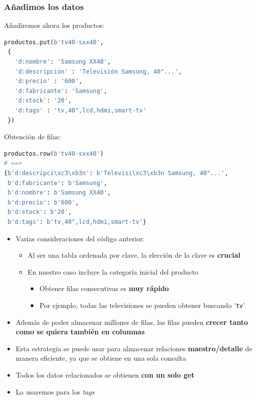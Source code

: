 \documentclass[14pt]{beamer}
\begin{document}
\begin{frame}
  \frametitle{Añadimos los datos}
Añadiremos ahora los productos:

\begin{lstlisting}[language=python]
productos.put(b'tv40-sxx40',
 {
   'd:nombre': 'Samsung XX40',
   'd:descripción' : 'Televisión Samsung, 40"...',
   'd:precio' : '600',
   'd:fabricante': 'Samsung',
   'd:stock': '20',
   'd:tags' : 'tv,40",lcd,hdmi,smart-tv'
 })
\end{lstlisting}



\framebreak
Obtención de filas:

\begin{lstlisting}[language=python]
productos.row(b'tv40-sxx40')
# ==>
{b'd:descripci\xc3\xb3n': b'Televisi\xc3\xb3n Samsung, 40"...',
 b'd:fabricante': b'Samsung',
 b'd:nombre': b'Samsung XX40',
 b'd:precio': b'600',
 b'd:stock': b'20',
 b'd:tags': b'tv,40",lcd,hdmi,smart-tv'}
\end{lstlisting}

\framebreak

\begin{itemize}
\item Varias consideraciones del código anterior:
  \begin{itemize}
  \item Al ser una tabla ordenada por clave, la elección de la clave es
    {\bf crucial}
  \item En nuestro caso incluye la categoría inicial del producto
    \begin{itemize}
    \item Obtener filas consecutivas es {\bf muy rápido}
    \item Por ejemplo, todas las televisiones se pueden obtener buscando
      '{\tt tv}'
    \end{itemize}
  \end{itemize}
\item Además de poder almacenar millones de filas, las filas pueden {\bf
    crecer tanto como se quiera también en columnas}
\item Esta estrategia se puede usar para almacenar relaciones {\bf
    maestro/detalle} de manera eficiente, ya que se obtiene en una sola
  consulta
\item Todos los datos relacionados se obtienen {\bf con un solo get}
\item La usaremos para los {\em tags}
\end{itemize}


\end{frame}
\end{document}
